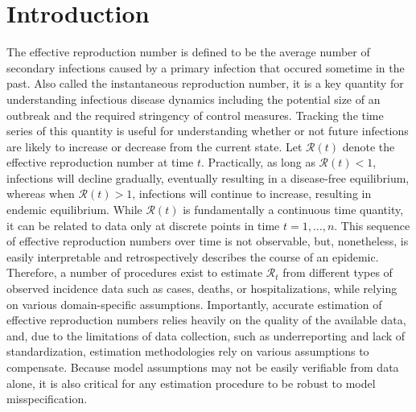 \documentclass[10pt,letterpaper]{article}
\def\calR{\mathcal{R}}
\begin{document}
\linenumbers

\section{Introduction}
\label{sec:intro}

The effective reproduction number is defined to be the average number of
secondary infections caused by a primary infection that occured sometime in the past. Also called the instantaneous reproduction number, it is a key quantity
for understanding infectious disease dynamics including the potential size of an
outbreak and the required stringency of control measures.  Tracking the time
series of this quantity is useful for understanding whether or not
future infections are likely to increase or decrease from the current state. Let
$\calR(t)$ denote the effective reproduction number at time $t$. Practically, as
long as $\calR(t) < 1$, infections will decline gradually, eventually resulting
in a disease-free equilibrium, whereas when $\calR(t) > 1$, infections will
continue to increase, resulting in endemic equilibrium. While $\calR(t)$ is
fundamentally a continuous time quantity, it can be related to data only at
discrete points in time $t = 1,\ldots,n$. This sequence of effective
reproduction numbers over time is not observable, but, nonetheless, is easily
interpretable and retrospectively describes the course of an epidemic.
Therefore, a number of procedures exist to estimate $\calR_t$ from different
types of observed incidence data such as cases, deaths, or hospitalizations,
while relying on various domain-specific assumptions. Importantly, accurate
estimation of effective reproduction numbers relies heavily on the quality of
the available data, and, due to the limitations of data collection, such as
underreporting and lack of standardization, estimation methodologies rely on
various assumptions to compensate. Because model assumptions may not be easily
verifiable from data alone, it is also critical for any estimation procedure to
be robust to model misspecification. 
\end{document}
